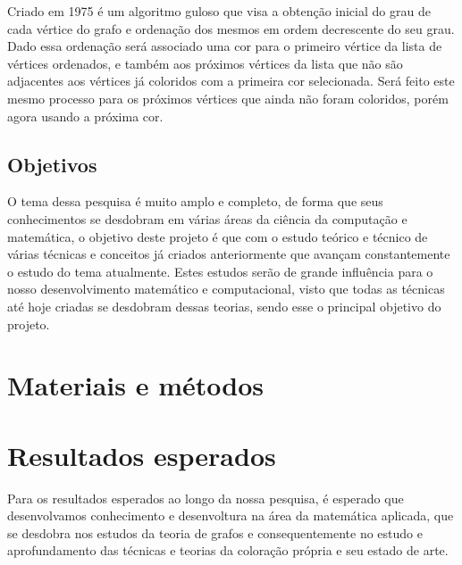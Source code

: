 \documentclass[12pt]{article}
\begin{document}
  Criado em 1975 é um algoritmo guloso que visa a obtenção inicial do grau de cada vértice do grafo e ordenação dos mesmos em ordem decrescente do seu grau. Dado essa ordenação será associado uma cor para o primeiro vértice da lista de vértices ordenados, e também aos próximos vértices da lista que não são adjacentes aos vértices já coloridos com a primeira cor selecionada. Será feito este mesmo processo para os próximos vértices que ainda não foram coloridos, porém agora usando a próxima cor.
  
  \subsection{Objetivos}
  
  O tema dessa pesquisa é muito amplo e completo, de forma que seus conhecimentos se desdobram em várias áreas da ciência da computação e matemática, o objetivo deste projeto é que com o estudo teórico e técnico de várias técnicas e conceitos já criados anteriormente que avançam constantemente o estudo do tema atualmente.
  Estes estudos serão de grande influência para o nosso desenvolvimento matemático e computacional, visto que todas as técnicas até hoje criadas se desdobram dessas teorias, sendo esse o principal objetivo do projeto.
  
  
  \section{Materiais e métodos}
  
  
  
  \section{Resultados esperados}
  Para os resultados esperados ao longo da nossa pesquisa, é esperado que desenvolvamos conhecimento e desenvoltura na área da matemática aplicada, que se desdobra nos estudos da teoria de grafos e consequentemente no estudo e aprofundamento das técnicas e teorias da coloração própria e seu estado de arte.
   
\end{document}
